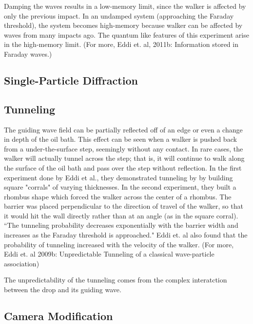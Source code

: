             Damping the waves results in a low-memory limit, since the walker is affected by only the previous impact. In an undamped system (approaching the Faraday threshold), the system becomes high-memory because walker can be affected by waves from many impacts ago. The quantum like features of this experiment arise in the high-memory limit. (For more, Eddi et. al, 2011b: Information stored in Faraday waves.) 

            \subsection{Single-Particle Diffraction}

	       \subsection{Tunneling}
	       The guiding wave field can be partially reflected off of an edge or even a change in depth of the oil bath. This effect can be seen when a walker is pushed back from a under-the-surface step, seemingly without any contact. In rare cases, the walker will actually tunnel across the step; that is, it will continue to walk along the surface of the oil bath and pass over the step without reflection. In the first experiment done by Eddi et al., they demonstrated tunneling by by building square "corrals" of varying thicknesses. In the second experiment, they built a rhombus shape which forced the walker across the center of a rhombus. The barrier was placed perpendicular to the direction of travel of the walker, so that it would hit the wall directly rather than at an angle (as in the square corral). ``The tunneling probability decreases exponentially with the barrier width and increases as the Faraday threshold is approached." Eddi et. al also found that the probability of tunneling increased with the velocity of the walker. (For more, Eddi et. al 2009b: Unpredictable Tunneling of a classical wave-particle association)
	       
	       
	        The unpredictability of the tunneling comes from the complex interatction between the drop and its guiding wave. 

	    \subsection{Camera Modification}
